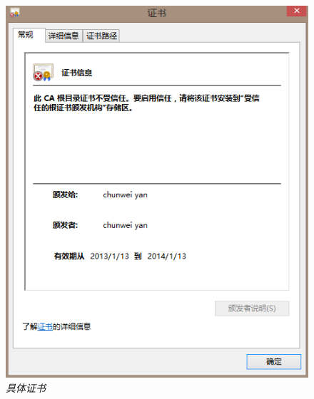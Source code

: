 \documentclass[a4paper]{ctexart}
\begin{document}
    \begin{figure}[]
        \centering
        \includegraphics{zhengshu2.png}
        \caption{\small \sl 具体证书}
        \label{fig:zhengshu2}
    \end{figure}
\end{document}
